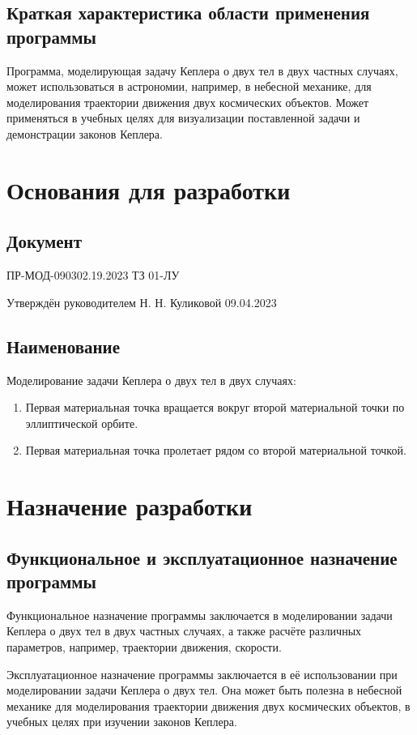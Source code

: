  \subsection{Краткая характеристика области применения программы}
 Программа, моделирующая задачу Кеплера о двух тел в двух частных случаях, может использоваться в астрономии, например, в небесной механике, для моделирования траектории движения двух космических объектов. Может применяться в учебных целях для визуализации поставленной задачи и демонстрации законов Кеплера.
 \section{Основания для разработки}
 \subsection{Документ}
 ПР-МОД-090302.19.2023 ТЗ 01-ЛУ

 Утверждён руководителем Н. Н. Куликовой 09.04.2023
 \subsection{Наименование}
 Моделирование задачи Кеплера о двух тел в двух случаях:
 \begin{enumerate}
  \item Первая материальная точка вращается вокруг второй материальной точки по эллиптической орбите.
  \item Первая материальная точка пролетает рядом со второй материальной точкой.
 \end{enumerate}
 \section{Назначение разработки}
 \subsection{Функциональное и эксплуатационное назначение программы}
 Функциональное назначение программы заключается в моделировании задачи Кеплера о двух тел в двух частных случаях, а также расчёте различных параметров, например, траектории движения, скорости.

 Эксплуатационное назначение программы заключается в её использовании при моделировании задачи Кеплера о двух тел. Она может быть полезна в небесной механике для моделирования траектории движения двух космических объектов, в учебных целях при изучении законов Кеплера.
